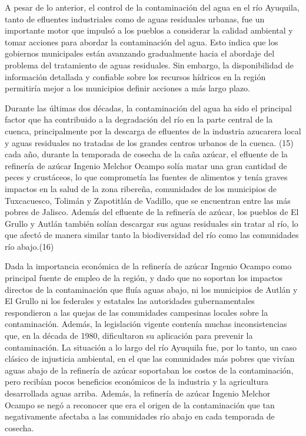     A pesar de lo anterior, el control de la contaminación del agua en el río Ayuquila, tanto de efluentes industriales como de aguas residuales urbanas, fue un importante motor que impulsó a los pueblos a considerar la calidad ambiental y tomar acciones para abordar la contaminación del agua. Esto indica que los gobiernos municipales están avanzando gradualmente hacia el abordaje del problema del tratamiento de aguas residuales. Sin embargo, la disponibilidad de información detallada y confiable sobre los recursos hídricos en la región permitiría mejor a los municipios definir acciones a más largo plazo.
    
    Durante las últimas dos décadas, la contaminación del agua ha sido el principal factor que ha contribuido a la degradación del río en la parte central de la cuenca, principalmente por la descarga de efluentes de la industria azucarera local y aguas residuales no tratadas de los grandes centros urbanos de la cuenca. (15) cada año, durante la temporada de cosecha de la caña azúcar, el efluente de la refinería de azúcar Ingenio Melchor Ocampo solía matar una gran cantidad de peces y crustáceos, lo que comprometía las fuentes de alimentos y tenía graves impactos en la salud de la zona ribereña, comunidades de los municipios de Tuxcacuesco, Tolimán y Zapotitlán de Vadillo, que se encuentran entre las más pobres de Jalisco. Además del efluente de la refinería de azúcar, los pueblos de El Grullo y Autlán también solían descargar sus aguas residuales sin tratar al río, lo que afectó de manera similar tanto la biodiversidad del río como las comunidades río abajo.(16)

    Dada la importancia económica de la refinería de azúcar Ingenio Ocampo como principal fuente de empleo de la región, y dado que no soportan los impactos directos de la contaminación que fluía aguas abajo, ni los municipios de Autlán y El Grullo ni los federales y estatales las autoridades gubernamentales respondieron a las quejas de las comunidades campesinas locales sobre la contaminación. Además, la legislación vigente contenía muchas inconsistencias que, en la década de 1980, dificultaron su aplicación para prevenir la contaminación. La situación a lo largo del río Ayuquila fue, por lo tanto, un caso clásico de injusticia ambiental, en el que las comunidades más pobres que vivían aguas abajo de la refinería de azúcar soportaban los costos de la contaminación, pero recibían pocos beneficios económicos de la industria y la agricultura desarrollada aguas arriba. Además, la refinería de azúcar Ingenio Melchor Ocampo se negó a reconocer que era el origen de la contaminación que tan negativamente afectaba a las comunidades río abajo en cada temporada de cosecha.

